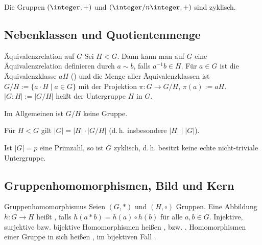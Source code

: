 \begin{Bsp}
    Die Gruppen $(\integer, +)$ und $(\integer/n\integer, +)$ sind zyklisch.
\end{Bsp}

\pagebreak

\subsection{%
    Nebenklassen und Quotientenmenge%
}

\begin{Def}{Äquivalenzrelation auf $G$}
    Sei $H < G$.
    Dann kann man auf $G$ eine Äquivalenzrelation definieren durch
    $a \sim b$, falls $a^{-1} b \in H$.
    Für $a \in G$ ist die Äquivalenzklasse $aH$ ()
    und die Menge aller Äquivalenzklassen ist
    $G/H := \{a \cdot H \;|\; a \in G\}$ mit der
    Projektion $\pi\colon G \rightarrow G/H$, $\pi(a) := aH$.
    $|G : H| := |G/H|$ heißt  der Untergruppe $H$ in $G$.
\end{Def}

\begin{Bem}
    Im Allgemeinen ist $G/H$ keine Gruppe.
\end{Bem}

\linie

\begin{Satz}{}
    Für $H < G$ gilt $|G| = |H| \cdot |G/H|$
    (d.\,h. insbesondere $|H| \;|\; |G|$).
\end{Satz}

\begin{Kor}
    Ist $|G| = p$ eine Primzahl, so ist $G$ zyklisch, d.\,h.
    besitzt keine echte nicht-triviale Untergruppe.
\end{Kor}

\subsection{%
    Gruppenhomomorphismen, Bild und Kern%
}

\begin{Def}{Gruppenhomomorphismus}
    Seien $(G, \ast)$ und $(H, \circ)$ Gruppen.
    Eine Abbildung $h\colon G \rightarrow H$ heißt ,
    falls $h(a \ast b) = h(a) \circ h(b)$ für alle $a, b \in G$.
    Injektive, surjektive bzw. bijektive Homomorphismen heißen
    ,  bzw.
    .
    Homomorphismen einer Gruppe in sich heißen ,
    im bijektiven Fall .
\end{Def}

